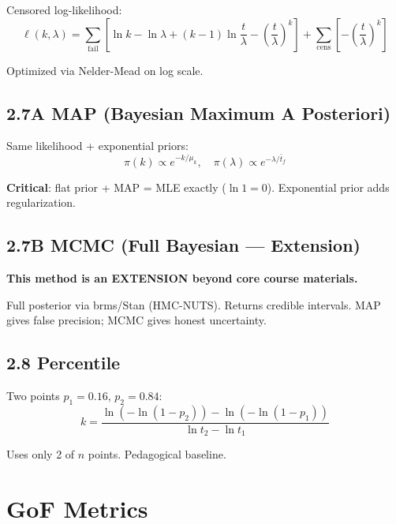 \documentclass[
]{article}
\begin{document}
Censored log-likelihood:
\[\ell(k,\lambda) = \sum_{\text{fail}} \left[\ln k - \ln\lambda + (k-1)\ln\frac{t}{\lambda} - \left(\frac{t}{\lambda}\right)^k\right] + \sum_{\text{cens}} \left[-\left(\frac{t}{\lambda}\right)^k\right]\]

Optimized via Nelder-Mead on log scale.

\subsection{2.7A MAP (Bayesian Maximum A
Posteriori)}\label{a-map-bayesian-maximum-a-posteriori}

Same likelihood + exponential priors:
\[\pi(k) \propto e^{-k/\mu_k}, \quad \pi(\lambda) \propto e^{-\lambda/\bar{t}_f}\]

\textbf{Critical}: flat prior + MAP = MLE exactly (\(\ln 1 = 0\)).
Exponential prior adds regularization.

\subsection{2.7B MCMC (Full Bayesian ---
Extension)}\label{b-mcmc-full-bayesian-extension}

\textbf{This method is an EXTENSION beyond core course materials.}

Full posterior via brms/Stan (HMC-NUTS). Returns credible intervals. MAP
gives false precision; MCMC gives honest uncertainty.

\subsection{2.8 Percentile}\label{percentile}

Two points \(p_1 = 0.16\), \(p_2 = 0.84\):
\[k = \frac{\ln(-\ln(1-p_2)) - \ln(-\ln(1-p_1))}{\ln t_2 - \ln t_1}\]

Uses only 2 of \(n\) points. Pedagogical baseline.

\section{GoF Metrics}\label{gof-metrics}
\end{document}
